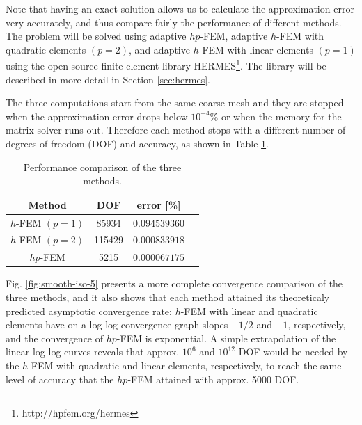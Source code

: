 \documentclass[final,3p,times,twocolumn]{elsarticle}
\begin{document}
Note that having an exact solution allows us to calculate the approximation 
error very accurately, and thus compare fairly the performance of different methods. 
The problem will be solved using adaptive $hp$-FEM, adaptive $h$-FEM with 
quadratic elements $(p = 2)$, and adaptive $h$-FEM with linear elements $(p = 1)$
using the open-source finite element library HERMES\footnote{http://hpfem.org/hermes}. 
The library will be described in more 
detail in Section \ref{sec:hermes}. 

The three computations start from the same coarse mesh and they are stopped when the 
approximation error drops below $10^{-4}\%$ or when the memory for the matrix solver 
runs out. Therefore each method stops with a different number of degrees of freedom (DOF) and
accuracy, as shown in Table \ref{table:1}.

\begin{table}[!ht]
\begin{center}
\begin{tabular}{|c|c|c|c|}
\hline
Method & DOF & error [\%]\\
\hline
\hline
$h$-FEM $(p=1)$ & 85934 &  $0.094539360$\\
\hline
$h$-FEM $(p=2)$ &115429  & $0.000833918$\\
\hline
$hp$-FEM & 5215 &          $0.000067175$\\
\hline
\end{tabular}
\end{center}
\vspace{-4mm}
\caption{Performance comparison of the three methods.}
\label{table:1}
\end{table}

Fig. \ref{fig:smooth-iso-5} presents a more complete 
convergence comparison of the three methods, and it also 
shows that each method attained its theoreticaly predicted 
asymptotic convergence rate: $h$-FEM with linear 
and quadratic elements have on a log-log convergence 
graph slopes $-1/2$ and $-1$, respectively, and the 
convergence of $hp$-FEM is exponential. A simple extrapolation 
of the linear log-log curves reveals that approx. $10^6$ 
and $10^{12}$ DOF would be needed by the $h$-FEM with quadratic
and linear elements, respectively, to reach the same level of  
accuracy that the $hp$-FEM attained with approx. 5000 DOF.
\end{document}
